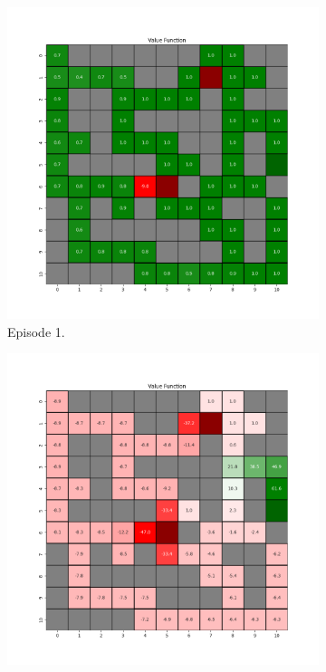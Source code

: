 \documentclass{assignment}
\begin{document}
\begin{figure}[H]
    \begin{subfigure}{0.3\textwidth}
        \includegraphics[width=\textwidth]{figures/value_td/alpha_sweep/value_function_alpha_0.1_gamma_0.95_epsilon_0.2_iteration_1.png}
    \caption{Episode 1.}
    \end{subfigure}\hfill
    \begin{subfigure}{0.3\textwidth}
        \includegraphics[width=\textwidth]{figures/value_td/alpha_sweep/value_function_alpha_0.1_gamma_0.95_epsilon_0.2_iteration_50.png}

\end{subfigure}
\end{figure}
\end{document}
